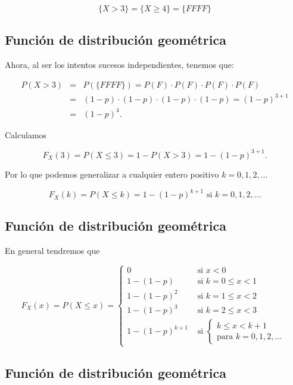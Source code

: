 \documentclass[]{book}
\begin{document}
\[
\{X>3\}=\{X\geq 4\}= \{FFFF\}
\]

\hypertarget{funciuxf3n-de-distribuciuxf3n-geomuxe9trica-1}{%
\subsection{Función de distribución geométrica}\label{funciuxf3n-de-distribuciuxf3n-geomuxe9trica-1}}

Ahora, al ser los intentos sucesos independientes, tenemos que:

\[
\begin{eqnarray*}
P(X>3) & = & P(\{FFFF\})= P(F)\cdot P(F)\cdot P(F)\cdot P(F)\\
&=& (1-p)\cdot (1-p)\cdot (1-p)\cdot (1-p)= (1-p)^{3+1}\\\
&=&(1-p)^{4}.
\end{eqnarray*}
\]

Calculamos

\[F_X(3)=P(X\leq 3)=1-P(X>3)=1-(1-p)^{3+1}.\]

Por lo que podemos generalizar a cualquier entero positivo \(k=0,1,2,\ldots\)

\[F_X(k)=P(X\leq k)=1-(1-p)^{k+1}\mbox{ si } k=0,1,2,\ldots\]

\hypertarget{funciuxf3n-de-distribuciuxf3n-geomuxe9trica-2}{%
\subsection{Función de distribución geométrica}\label{funciuxf3n-de-distribuciuxf3n-geomuxe9trica-2}}

En general tendremos que

\[
F_X(x)=P(X\leq x)=
\left\{\begin{array}{ll} 
0 & \mbox{ si } x<0\\
1- (1-p)  & \mbox{ si } k=0\leq x <1\\
1- (1-p)^2 & \mbox{ si } k=1\leq x <2\\
1- (1-p)^3 & \mbox{ si } k=2\leq x <3\\
1- (1-p)^{k+1} & \mbox{ si } \left\{ \begin{array}{l}k\leq x< k+1\\\mbox{para } k=0,1,2,\ldots\end{array}
    \right.\end{array}\right.
\]

\hypertarget{funciuxf3n-de-distribuciuxf3n-geomuxe9trica-3}{%
\subsection{Función de distribución geométrica}\label{funciuxf3n-de-distribuciuxf3n-geomuxe9trica-3}}
\end{document}
